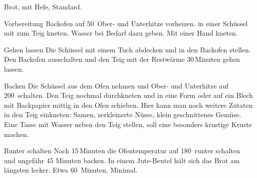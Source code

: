 \begin{recipe}{Brot, mit Hefe, Standard.}
	\item[Vorbereitung] Backofen auf 50\textcelsius~Ober- und Unterhitze vorheizen.
	 in einer Schüssel mit
	 zum Teig kneten. 
	\hint Wasser bei Bedarf dazu geben. 
	\hint Mit einer Hand kneten.
	\item[Gehen lassen] Die Schüssel mit einem Tuch abdecken und in den Backofen stellen. Den Backofen ausschalten und den Teig mit der Restwärme 30\,Minuten gehen lassen.
	\item[Backen] Die Schüssel aus dem Ofen nehmen und Ober- und Unterhitze auf 200\textcelsius~schalten. Den Teig nochmal durchkneten und in eine Form oder auf ein Blech mit Backpapier mittig in den Ofen schieben. 
	\hint Hier kann man noch weitere Zutaten in den Teig einkneten: Samen, zerkleinerte Nüsse, klein geschnittenes Gemüse.
	\hint Eine Tasse mit Wasser neben den Teig stellen, soll eine besonders krustige Kruste machen.
	\item[Runter schalten] Nach 15\,Minuten die Ofentemperatur auf 180\textcelsius~runter schalten und ungefähr 45 Minuten backen.
	\hint In einem Jute-Beutel hält sich das Brot am längsten lecker.
	\preparationtime Etwa 60~Minuten.
	\washingup Minimal.
\end{recipe}
